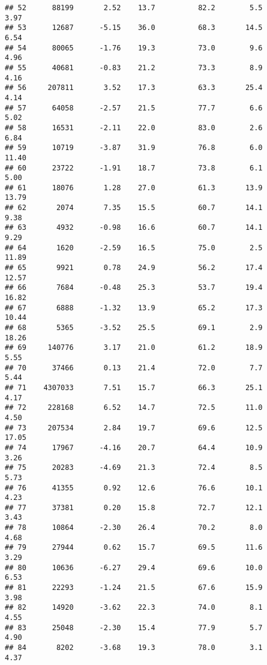 \documentclass[
]{article}
\begin{document}
\begin{verbatim}
## 52      88199       2.52    13.7          82.2        5.5              3.97
## 53      12687      -5.15    36.0          68.3       14.5              6.54
## 54      80065      -1.76    19.3          73.0        9.6              4.96
## 55      40681      -0.83    21.2          73.3        8.9              4.16
## 56     207811       3.52    17.3          63.3       25.4              4.14
## 57      64058      -2.57    21.5          77.7        6.6              5.02
## 58      16531      -2.11    22.0          83.0        2.6              6.84
## 59      10719      -3.87    31.9          76.8        6.0             11.40
## 60      23722      -1.91    18.7          73.8        6.1              5.00
## 61      18076       1.28    27.0          61.3       13.9             13.79
## 62       2074       7.35    15.5          60.7       14.1              9.38
## 63       4932      -0.98    16.6          60.7       14.1              9.29
## 64       1620      -2.59    16.5          75.0        2.5             11.89
## 65       9921       0.78    24.9          56.2       17.4             12.57
## 66       7684      -0.48    25.3          53.7       19.4             16.82
## 67       6888      -1.32    13.9          65.2       17.3             10.44
## 68       5365      -3.52    25.5          69.1        2.9             18.26
## 69     140776       3.17    21.0          61.2       18.9              5.55
## 70      37466       0.13    21.4          72.0        7.7              5.44
## 71    4307033       7.51    15.7          66.3       25.1              4.17
## 72     228168       6.52    14.7          72.5       11.0              4.50
## 73     207534       2.84    19.7          69.6       12.5             17.05
## 74      17967      -4.16    20.7          64.4       10.9              3.26
## 75      20283      -4.69    21.3          72.4        8.5              5.73
## 76      41355       0.92    12.6          76.6       10.1              4.23
## 77      37381       0.20    15.8          72.7       12.1              3.43
## 78      10864      -2.30    26.4          70.2        8.0              4.68
## 79      27944       0.62    15.7          69.5       11.6              3.29
## 80      10636      -6.27    29.4          69.6       10.0              6.53
## 81      22293      -1.24    21.5          67.6       15.9              3.98
## 82      14920      -3.62    22.3          74.0        8.1              4.55
## 83      25048      -2.30    15.4          77.9        5.7              4.90
## 84       8202      -3.68    19.3          78.0        3.1              4.37

\end{verbatim}
\end{document}
